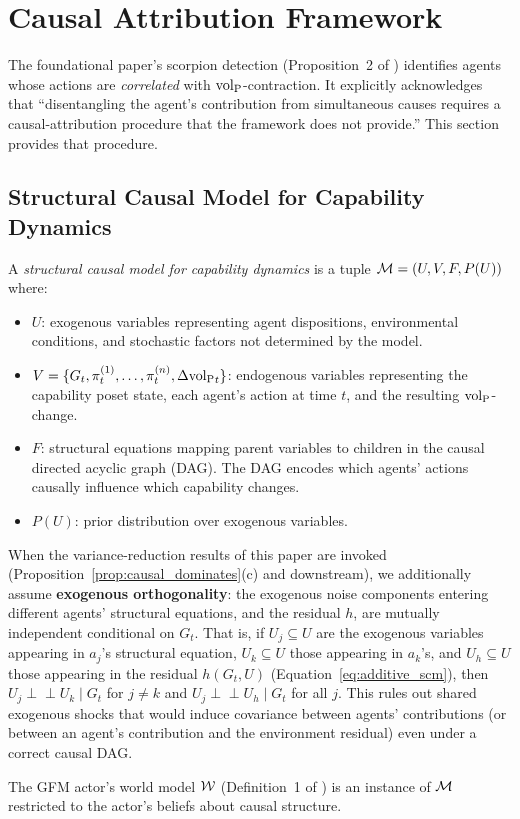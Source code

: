 \section{Causal Attribution Framework}
\label{sec:causal}

The foundational paper's scorpion detection
(Proposition~2 of \citet{lasser2026gfm}) identifies agents whose actions are
\emph{correlated} with ${\operatorname{vol}_{\mathrm{P}}}$-contraction. It explicitly acknowledges that
``disentangling the agent's contribution from simultaneous causes requires a
causal-attribution procedure that the framework does not provide.'' This
section provides that procedure.

\subsection{Structural Causal Model for Capability Dynamics}

\begin{definition}
\label{def:scm}
A \emph{structural causal model for capability dynamics} is a tuple
    $\mathcal{M} = (U, V, F, P(U))$ where:
\begin{itemize}
\item $U$: exogenous variables representing agent dispositions, environmental
    conditions, and stochastic factors not determined by the model.
\item $V = \{G_t, \pi_t^{(1)}, \ldots, \pi_t^{(n)}, \Delta {\operatorname{vol}_{\mathrm{P}}}_t\}$:
    endogenous variables representing the capability poset state, each
    agent's action at time $t$, and the resulting ${\operatorname{vol}_{\mathrm{P}}}$-change.
\item $F$: structural equations mapping parent variables to children in the
    causal directed acyclic graph (DAG). The DAG encodes which agents'
    actions causally influence which capability changes.
\item $P(U)$: prior distribution over exogenous variables.
\end{itemize}
When the variance-reduction results of this paper are invoked
    (Proposition~\ref{prop:causal_dominates}(c) and downstream), we
    additionally assume \textbf{exogenous orthogonality}: the
    exogenous noise components entering different agents' structural
    equations, and the residual $h$, are mutually independent
    conditional on $G_t$. That is,
    if $U_j \subseteq U$ are the exogenous variables appearing in
    $a_j$'s structural equation, $U_k \subseteq U$ those appearing
    in $a_k$'s, and $U_h \subseteq U$ those appearing in the
    residual $h(G_t, U)$
    (Equation~\eqref{eq:additive_scm}), then
    $U_j \perp\!\!\!\perp U_k \mid G_t$ for $j \neq k$ and
    $U_j \perp\!\!\!\perp U_h \mid G_t$ for all $j$.
    This rules out shared exogenous shocks that would induce
    covariance between agents' contributions (or between an agent's
    contribution and the environment residual) even under a correct
    causal DAG.

The GFM actor's world model $\mathcal{W}$
    (Definition~1 of \citet{lasser2026horizon}) is an instance of $\mathcal{M}$
    restricted to the actor's beliefs about causal structure.
\end{definition}

